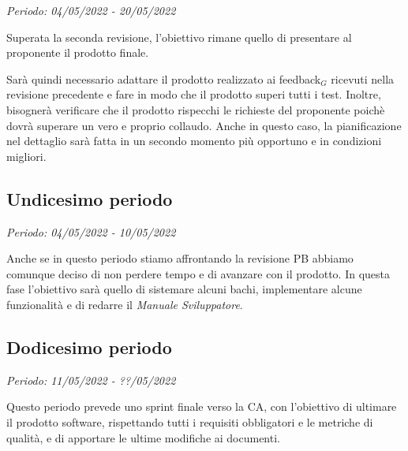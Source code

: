\textit{Periodo: 04/05/2022 - 20/05/2022}

Superata la seconda revisione, l'obiettivo rimane quello di presentare al proponente il prodotto finale.

Sarà quindi necessario adattare il prodotto realizzato ai feedback$_G$ ricevuti nella revisione precedente e fare in modo che il prodotto superi tutti i test. Inoltre, bisognerà
verificare che il prodotto rispecchi le richieste del proponente poichè dovrà superare un vero e proprio collaudo.
Anche in questo caso, la pianificazione nel dettaglio sarà fatta in un secondo momento più opportuno e in condizioni migliori.

\subsection{Undicesimo periodo}
\textit{Periodo: 04/05/2022 - 10/05/2022}

Anche se in questo periodo stiamo affrontando la revisione PB abbiamo comunque deciso di non perdere tempo e di avanzare con il prodotto. In questa fase l'obiettivo sarà quello di sistemare alcuni bachi, implementare alcune funzionalità e di redarre il \textit{Manuale Sviluppatore}.

\subsection{Dodicesimo periodo}
\textit{Periodo: 11/05/2022 - ??/05/2022}

Questo periodo prevede uno sprint finale verso la CA, con l'obiettivo di ultimare il prodotto software, rispettando tutti i requisiti obbligatori e le metriche di qualità, e di apportare le ultime modifiche ai documenti.
